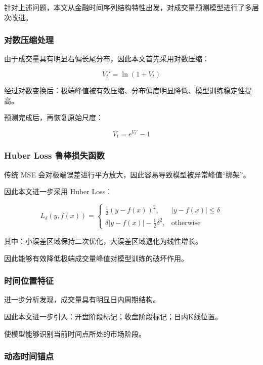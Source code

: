 \documentclass[withoutpreface,bwprint]{cumcmthesis}
\begin{document}
针对上述问题，本文从金融时间序列结构特性出发，对成交量预测模型进行了多层次改进。

\subsubsection{对数压缩处理}

由于成交量具有明显右偏长尾分布，因此本文首先采用对数压缩：

\begin{equation}
V_t'=\ln(1+V_t)
\end{equation}

经过对数变换后：极端峰值被有效压缩、分布偏度明显降低、模型训练稳定性提高。

预测完成后，再恢复原始尺度：

\begin{equation}
V_t=e^{V_t'}-1
\end{equation}

\subsubsection{Huber Loss 鲁棒损失函数}

传统 MSE 会对极端误差进行平方放大，因此容易导致模型被异常峰值“绑架”。

因此本文进一步采用 Huber Loss：

\begin{equation}
L_\delta(y,f(x))=
\begin{cases}
\frac{1}{2}(y-f(x))^2,& |y-f(x)|\leq\delta \\
\delta|y-f(x)|-\frac{1}{2}\delta^2,& \text{otherwise}
\end{cases}
\end{equation}

其中：小误差区域保持二次优化，大误差区域退化为线性增长。

因此能够有效降低极端成交量峰值对模型训练的破坏作用。

\subsubsection{时间位置特征}

进一步分析发现，成交量具有明显日内周期结构。

因此本文进一步引入：开盘阶段标记；收盘阶段标记；日内K线位置。

使模型能够识别当前时间点所处的市场阶段。

\subsubsection{动态时间锚点}
\end{document}
